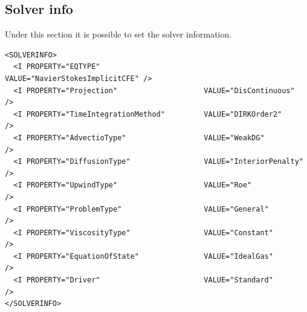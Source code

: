 \subsection*{Solver info}
Under this section it is possible to set the solver information.
\begin{lstlisting}[style=XmlStyle]
<SOLVERINFO>
  <I PROPERTY="EQTYPE"                        VALUE="NavierStokesImplicitCFE" />
  <I PROPERTY="Projection"                    VALUE="DisContinuous"           />
  <I PROPERTY="TimeIntegrationMethod"         VALUE="DIRKOrder2"              />
  <I PROPERTY="AdvectioType"                  VALUE="WeakDG"                  />
  <I PROPERTY="DiffusionType"                 VALUE="InteriorPenalty"         />
  <I PROPERTY="UpwindType"                    VALUE="Roe"                     />
  <I PROPERTY="ProblemType"                   VALUE="General"                 />
  <I PROPERTY="ViscosityType"                 VALUE="Constant"                />
  <I PROPERTY="EquationOfState"               VALUE="IdealGas"                />
  <I PROPERTY="Driver"                        VALUE="Standard"                />
</SOLVERINFO>
\end{lstlisting}
